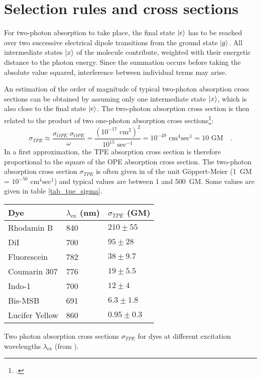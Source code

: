 \section{Selection rules and cross sections}

For two-photon absorption to take place, the
final state $\ket{e}$ has to be reached  over two successive electrical
dipole transitions from the ground state  $\ket{g}$.  
All intermediate states  $\ket{x}$ of the molecule contribute, weighted  with their energetic
distance to the photon energy.
Since the summation occurs before taking the absolute value squared, interference between individual terms may arise.



An estimation of the order of magnitude of typical
two-photon absorption cross sections can
be obtained by 
assuming only one   intermediate state $\ket{x}$, which is also close to the
final state $\ket{e}$. The two-photon absorption cross section is then related to the product of two one-photon absorption cross sections\footcite{xu97}:
\begin{equation}
\sigma_{TPE} \approx \frac{\sigma_{OPE} \; \sigma_{OPE}}{ \omega}
= \frac{(10^{-17} \text{ cm}^2)^2}{10^{15} \text{ sec}^{-1}} =
10^{-49}\text{ cm}^4\text{sec}^{1} = 10\text{ GM} \quad .
\end{equation}
In a first approximation, the TPE absorption cross section is therefore
proportional to the square of the OPE absorption cross section. The
two-photon absorption cross section $\sigma_{TPE}$ is often given in
of the unit Göppert-Meier (1~GM =
$10^{-50}\text{ cm}^4\text{sec}^{1}$) and typical values are
between 1 and 500~GM. 
Some  values are given  in
table \ref{tab_tpe_sigma}.



\begin{margintable} \renewcommand{\arraystretch}{1.1}
\begin{tabular}{lll}
 Dye & $\lambda_{\text{ex}}$ (nm) & $\sigma_{TPE}$ (GM) \\
\hline Rhodamin B & 840    & $210 \pm 55$ \\
DiI      & 700    & $95 \pm 28$   \\
Fluorescein & 782  &  $38 \pm 9.7$ \\
Coumarin 307 & 776  &  $19 \pm 5.5$   \\
Indo-1   & 700    &  $12 \pm 4$ \\
Bis-MSB & 691    & $6.3 \pm 1.8$ \\
Lucifer Yellow & 860  &  $0.95 \pm 0.3$   \\ 
\end{tabular}
\caption{Two photon absorption cross sections $\sigma_{TPE}$
for dyes at different excitation wavelengths
$\lambda_{\text{ex}}$ (from \cite{xu96mar}). } \label{tab_tpe_sigma}
\end{margintable}


